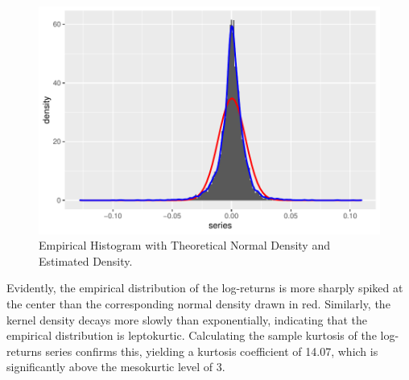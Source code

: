 \begin{figure}[H]
    \centering
    \includegraphics[scale=0.75]{fig/img/histogramplot.pdf}
    \caption{Empirical Histogram with Theoretical Normal Density and Estimated Density.}
    \label{fig:my_label}
\end{figure}
Evidently, the empirical distribution of the log-returns is more sharply spiked at the center than the corresponding normal density drawn in red. Similarly, the kernel density decays more slowly than exponentially, indicating that the empirical distribution is leptokurtic. Calculating the sample kurtosis of the log-returns series confirms this, yielding a kurtosis coefficient of 14.07, which is significantly above the mesokurtic level of 3.

